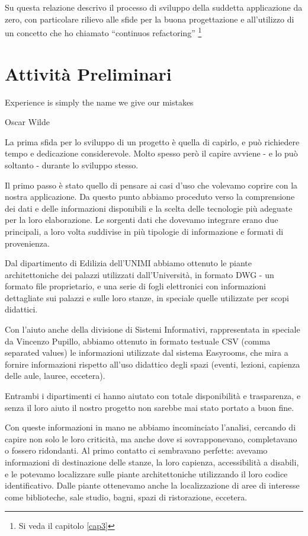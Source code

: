 \documentclass[12pt]{report}
\begin{document}
Su questa relazione descrivo il processo di sviluppo della suddetta applicazione da zero, con particolare rilievo alle sfide per la buona progettazione e all'utilizzo di un concetto che ho chiamato “continuos refactoring” \footnote{Si veda il capitolo \ref{cap3}}


% 
% 
\chapter{Attività Preliminari}
\label{cap2}

\epigraph{Experience is simply the name we give our mistakes}{Oscar Wilde}



La prima sfida per lo sviluppo di un progetto è quella di capirlo, e può richiedere tempo e dedicazione considerevole. Molto spesso però il capire avviene - e lo può soltanto - durante lo sviluppo stesso.

Il primo passo è stato quello di pensare ai casi d'uso che volevamo coprire con la nostra applicazione. Da questo punto abbiamo proceduto verso la comprensione dei dati e delle informazioni disponibili e la scelta delle tecnologie più adeguate per la loro elaborazione. Le sorgenti dati che dovevamo integrare erano due principali, a loro volta suddivise in più tipologie di informazione e formati di provenienza.

Dal dipartimento di Edilizia dell'UNIMI abbiamo ottenuto le piante architettoniche dei palazzi utilizzati dall'Università, in formato DWG - un formato file proprietario, e una serie di fogli elettronici con informazioni dettagliate sui palazzi e sulle loro stanze, in speciale quelle utilizzate per scopi didattici.

Con l'aiuto anche della divisione di Sistemi Informativi, rappresentata in speciale da Vincenzo Pupillo, abbiamo ottenuto in formato testuale CSV (comma separated values) le informazioni utilizzate dal sistema Easyrooms, che mira a fornire informazioni rispetto all'uso didattico degli spazi (eventi, lezioni, capienza delle aule, lauree, eccetera).

Entrambi i dipartimenti ci hanno aiutato con totale disponibilità e trasparenza, e senza il loro aiuto il nostro progetto non sarebbe mai stato portato a buon fine.

Con queste informazioni in mano ne abbiamo incominciato l'analisi, cercando di capire non solo le loro criticità, ma anche dove si sovrapponevano, completavano o fossero ridondanti. Al primo contatto ci sembravano perfette: avevamo informazioni di destinazione delle stanze, la loro capienza, accessibilità a disabili, e le potevamo localizzare sulle piante architettoniche utilizzando il loro codice identificativo. Dalle piante ottenevamo anche la localizzazione di aree di interesse come biblioteche, sale studio, bagni, spazi di ristorazione, eccetera.
\end{document}
